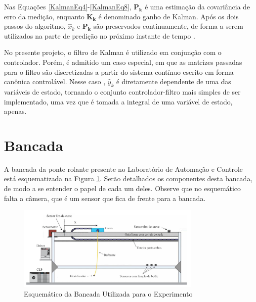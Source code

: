 Nas Equações \ref{KalmanEq4}-\ref{KalmanEq8}, $\mathbf{P_k}$ é uma estimação da covariância de erro da medição, enquanto $\mathbf{K_k}$ é denominado ganho de Kalman. Após os dois passos do algoritmo, $\hat{x}_k$ e $\mathbf{P_k}$ são preservados continuamente, de forma a serem utilizados na parte de predição no próximo instante de tempo \cite{GoddardKalman}.

No presente projeto, o filtro de Kalman é utilizado em conjunção com o controlador. Porém, é admitido um caso especial, em que as matrizes passadas para o filtro são discretizadas a partir do sistema contínuo escrito em forma canônica controlável. Nesse caso , $\hat{y}_k$ é diretamente dependente de uma das variáveis de estado, tornando o conjunto controlador-filtro mais simples de ser implementado, uma vez que é tomada a integral de uma variável de estado, apenas.

\section{Bancada\label{bancada}}
A bancada da ponte rolante presente no Laboratório de Automação e Controle está esquematizada na Figura \ref{bancadaEsquematico}. Serão detalhados os componentes desta bancada, de modo a se entender o papel de cada um deles. Observe que no esquemático falta a câmera, que é um sensor que fica de frente para a bancada. 

\begin{figure}[hbt]
\centering
  \includegraphics[width=0.8\textwidth]{figs/fundamentos/bancadaEsquematico}
  \caption{Esquemático da Bancada Utilizada para o Experimento \cite{redytton}\label{bancadaEsquematico}}
\end{figure}

